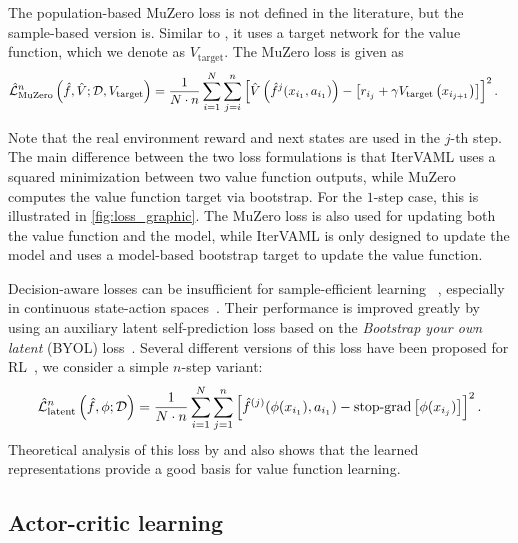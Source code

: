 The population-based MuZero loss is not defined in the literature, but the sample-based version is.
Similar to \textcite{dqn}, it uses a target network for the value function, which we denote as $V_\text{target}$. The MuZero loss is given as 
\begin{align}
    \hat{\mathcal{L}}^n_\text{MuZero}\left(\hat{f}, \hat{V}; \mathcal{D}, V_\text{target}\right) &= \frac{1}{N\cdot n}\sum_{i=1}^N \sum_{j=i}^n \left[  \hat{V}\left( \hat{f}^j(x_{i_1}, a_{i_1}) \right) - \left[ r_{i_j} + \gamma V_\text{target}\left( x_{i_{j+1}} \right)  \right] \right]^2. \label{eq:muzero}
\end{align}

Note that the real environment reward and next states are used in the $j$-th step.
The main difference between the two loss formulations is that IterVAML uses a squared minimization between two value function outputs, while MuZero computes the value function target via bootstrap.
For the $1$-step case, this is illustrated in \autoref{fig:loss_graphic}.
The MuZero loss is also used for updating both the value function and the model, while IterVAML is only designed to update the model and uses a model-based bootstrap target to update the value function.

Decision-aware losses can be insufficient for sample-efficient learning ~\parencite{ye2021mastering}, especially in continuous state-action spaces~\parencite{tdmpc}.
Their performance is improved greatly by using an auxiliary latent self-prediction loss based on the \emph{Bootstrap your own latent} (BYOL) loss~\parencite{grill2020bootstrap}.
Several different versions of this loss have been proposed for RL~\parencite{gelada2019deepmdp,schwarzer2021dataefficient,tang2022understanding}, we consider a simple $n$-step variant:
\begin{align}
    \hat{\mathcal{L}}^n_\text{latent}\left( \hat{f}, \phi; \mathcal{D} \right) = \frac{1}{N\cdot n}\sum_{i=1}^N \sum_{j=1}^n \left[ \hat{f}^{(j)}(\phi(x_{i_1}), a_{i_1}) - \text{stop-grad}\left[ \phi(x_{i_j}) \right] \right]^2.
\end{align}
Theoretical analysis of this loss by \textcite{gelada2019deepmdp} and \textcite{tang2022understanding} also shows that the learned representations provide a good basis for value function learning.

\subsection{Actor-critic learning}
\label{sec:ac}

